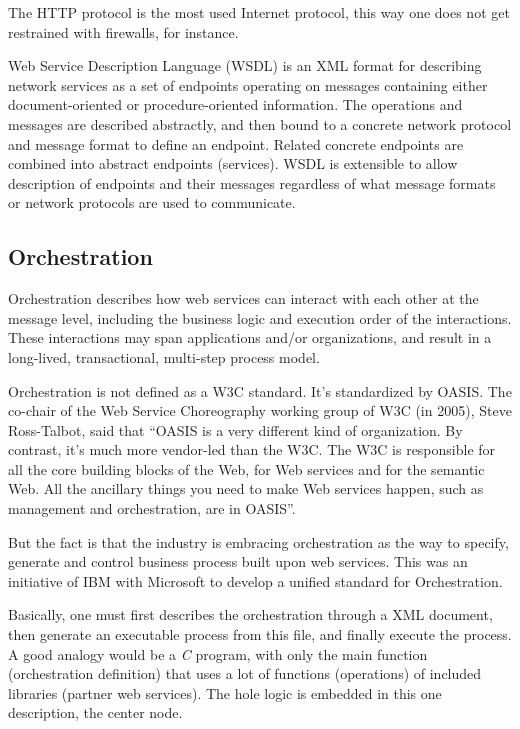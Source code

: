 The HTTP protocol is the most used Internet protocol, this way one does not get restrained with firewalls, for instance.

Web Service Description Language (WSDL) is an XML format for describing network services as a set of endpoints operating on messages containing either document-oriented or procedure-oriented information. The operations and messages are described abstractly, and then bound to a concrete network protocol and message format to define an endpoint. Related concrete endpoints are combined into abstract endpoints (services). WSDL is extensible to allow description of endpoints and their messages regardless of what message formats or network protocols are used to communicate.

\subsection{Orchestration}
Orchestration describes how web services can interact with each other at the message level, including the business logic and execution order of the interactions. These interactions may span applications and/or organizations, and result in a long-lived, transactional, multi-step process model.

Orchestration is not defined as a W3C standard. It's standardized by OASIS. The co-chair of the Web Service Choreography working group of W3C (in 2005), Steve Ross-Talbot, said that ``OASIS is a very different kind of organization. By contrast, it's much more vendor-led than the W3C. The W3C is responsible for all the core building blocks of the Web, for Web services and for the semantic Web. All the ancillary things you need to make Web services happen, such as management and orchestration, are in OASIS''. \citep{INTERVIEW}

But the fact is that the industry is embracing orchestration as the way to specify, generate and control business process built upon web services. This was an initiative of IBM with Microsoft to develop a unified standard for Orchestration.

Basically, one must first describes the orchestration through a XML document, then generate an executable process from this file, and finally execute the process. A good analogy would be a \emph{C} program, with only the main function (orchestration definition) that uses a lot of functions (operations) of included libraries (partner web services). The hole logic is embedded in this one description, the center node. 

